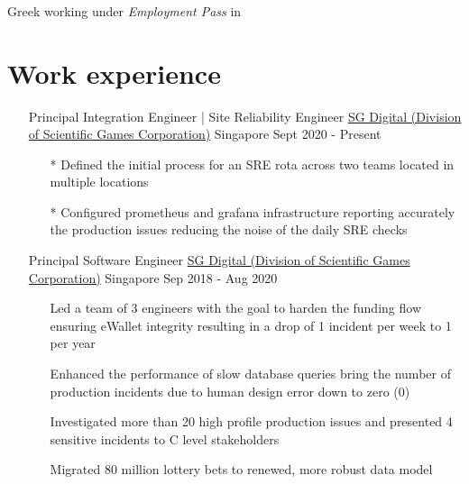 \documentclass{CVSoftwareEngineer}
\begin{document}
	\section{\textbf{\cvname}}
	\begin{center}
		\href{mailto:\cvmail}{\cvmail} \space \textbar \space \cvlinkedin \space \textbar \space \cvgithub \\
		Greek working under \textit{Employment Pass} in \cvaddress
	\end{center}

	\section{Work experience}
	\begin{enumerate}[labelwidth=!, labelindent=0pt, leftmargin=*, rightmargin=15pt]
		\item[] \cvExperience
			{Principal Integration Engineer | Site Reliability Engineer}
			{\href{https://www.sgdigital.com/}{SG Digital (Division of Scientific Games Corporation)}}
			{Singapore}
			{Sept 2020 - Present}
			{\begin{enumerate}[labelwidth=!, labelindent=0pt, nosep, leftmargin=*]
					\item[*] Defined the initial process for an SRE rota across two teams located in multiple locations
					\item[*] Configured prometheus and grafana infrastructure reporting accurately the production issues reducing the noise of the daily SRE checks
				\end{enumerate}
			}

		\item[] \cvExperience
			{Principal Software Engineer}
			{\href{https://www.sgdigital.com/}{SG Digital (Division of Scientific Games Corporation)}}
			{Singapore}
			{Sep 2018 - Aug 2020}
			{\begin{enumerate}[labelwidth=!, labelindent=0pt, nosep, leftmargin=*]
					\item[\textasteriskcentered] Led a team of 3 engineers with the goal to harden the
						funding flow ensuring eWallet integrity resulting in a drop of 1 incident per week
						to 1 per year
					\item[\textasteriskcentered] Enhanced the performance of slow database queries bring
						the number of production incidents due to human design error down to zero (0)
					\item[\textasteriskcentered] Investigated more than 20 high profile production
						issues and presented 4 sensitive incidents to C level stakeholders
					\item[\textasteriskcentered] Migrated 80 million lottery bets to renewed,
						more robust data model
				\end{enumerate}
			}


\end{enumerate}
\end{document}
